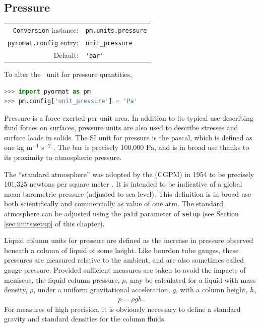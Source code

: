 %
%

\subsection{Pressure}\label{sec:units:pressure}

\begin{tabular}{rl}
\hline
\verb|Conversion| instance: & \verb|pm.units.pressure|\\
\verb|pyromat.config| entry: & \verb|unit_pressure|\\
Default: & \verb|'bar'|\\
\hline
\end{tabular}
\vspace{1em}

To alter the \PM\ unit for pressure quantities,
\begin{lstlisting}[language=Python]
>>> import pyormat as pm
>>> pm.config['unit_pressure'] = 'Pa'
\end{lstlisting}

Pressure is a force exerted per unit area.  In addition to its typical use describing fluid forces on surfaces, pressure units are also used to describe stresses and surface loads in solids.  The SI unit for pressure is the pascal, which is defined as one kg m$^{-1}$ s$^{-2}$ \cite[p.137]{si:2019}.  The bar is precisely 100,000 Pa, and is in broad use thanks to its proximity to atmospheric pressure. 

The ``standard atmosphere'' was adopted by the (CGPM) in 1954 to be precisely 101,325 newtons per square meter \cite{cgpm:10:4}.  It is intended to be indicative of a global mean barometric pressure (adjusted to sea level).  This definition is in broad use both scientifically \cite{crc} and commercially \cite{nist:sp811} as value of one atm.  The standard atmosphere can be adjusted using the \verb|pstd| parameter of \verb|setup| (see Section \ref{sec:units:setup} of this chapter).

Liquid column units for pressure are defined as the increase in pressure observed beneath a column of liquid of some height.  Like bourdon tube gauges, these pressures are measured relative to the ambient, and are also sometimes called gauge pressure.  Provided sufficient measures are taken to avoid the impacts of meniscus, the liquid column pressure, $p$, may be calculated for a liquid with mass density, $\rho$, under a uniform gravitational acceleration, $g$, with a column height, $h$,
\begin{align}
p = \rho g h.
\end{align}
For measures of high precision, it is obviously necessary to define a standard gravity and standard densities for the column fluids.

